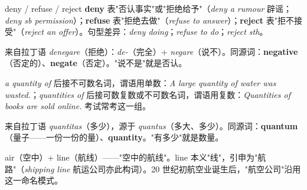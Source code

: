 \documentclass[../main.tex]{subfiles}
\begin{document}



\begin{lex}{deny / refuse / reject}
\textbf{deny} 表"否认事实"或"拒绝给予"（\textit{deny a rumour} 辟谣；\textit{deny sb permission}）；\textbf{refuse} 表"拒绝去做"（\textit{refuse to answer}）；\textbf{reject} 表"拒不接受"（\textit{reject an offer}）。句型差异：\textit{deny doing}；\textit{refuse to do}；\textit{reject sth}。
\end{lex}

\begin{origin}
来自拉丁语 \textit{denegare}（拒绝）：\textit{de-}（完全）+ \textit{negare}（说不）。同源词：\textbf{negative}（否定的）、\textbf{negate}（否定）。"说不是"就是否认。
\end{origin}




\begin{gram}
\textit{a quantity of} 后接不可数名词，谓语用单数：\textit{A large quantity of water was wasted.}；\textit{quantities of} 后接可数复数或不可数名词，谓语用复数：\textit{Quantities of books are sold online.} 考试常考这一组。
\end{gram}

\begin{origin}
来自拉丁语 \textit{quantitas}（多少），源于 \textit{quantus}（多大、多少）。同源词：\textbf{quantum}（量子——一份一份的量）、\textbf{quantity}。"有多少"就是数量。
\end{origin}



\begin{origin}
air（空中）+ line（航线）——"空中的航线"。line 本义"线"，引申为"航路"（\textit{shipping line} 航运公司亦此构词）。20 世纪初航空业诞生后，"航空公司"沿用这一命名模式。
\end{origin}
\end{document}

